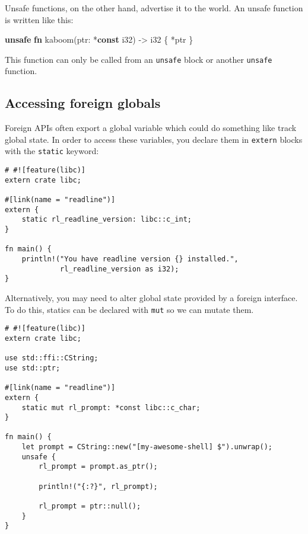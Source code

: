 \documentclass[a4paper,]{book}
\newenvironment{Shaded}{\begin{snugshade}}{\end{snugshade}}
\newcommand{\KeywordTok}[1]{\textcolor[rgb]{0.13,0.29,0.53}{\textbf{{#1}}}}
\newcommand{\DataTypeTok}[1]{\textcolor[rgb]{0.13,0.29,0.53}{{#1}}}
\newcommand{\NormalTok}[1]{{#1}}
\begin{document}
Unsafe functions, on the other hand, advertise it to the world. An
unsafe function is written like this:

\begin{Shaded}
\begin{Highlighting}[]
\KeywordTok{unsafe} \KeywordTok{fn} \NormalTok{kaboom(ptr: *}\KeywordTok{const} \DataTypeTok{i32}\NormalTok{) -> }\DataTypeTok{i32} \NormalTok{\{ *ptr \}}
\end{Highlighting}
\end{Shaded}

This function can only be called from an \texttt{unsafe} block or
another \texttt{unsafe} function.

\subsection{Accessing foreign globals}\label{accessing-foreign-globals}

Foreign APIs often export a global variable which could do something
like track global state. In order to access these variables, you declare
them in \texttt{extern} blocks with the \texttt{static} keyword:

\begin{verbatim}
# #![feature(libc)]
extern crate libc;

#[link(name = "readline")]
extern {
    static rl_readline_version: libc::c_int;
}

fn main() {
    println!("You have readline version {} installed.",
             rl_readline_version as i32);
}
\end{verbatim}

Alternatively, you may need to alter global state provided by a foreign
interface. To do this, statics can be declared with \texttt{mut} so we
can mutate them.

\begin{verbatim}
# #![feature(libc)]
extern crate libc;

use std::ffi::CString;
use std::ptr;

#[link(name = "readline")]
extern {
    static mut rl_prompt: *const libc::c_char;
}

fn main() {
    let prompt = CString::new("[my-awesome-shell] $").unwrap();
    unsafe {
        rl_prompt = prompt.as_ptr();

        println!("{:?}", rl_prompt);

        rl_prompt = ptr::null();
    }
}
\end{verbatim}
\end{document}
